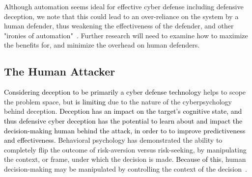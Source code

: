 \documentclass{article}
\newcommand\mmm[1]{\textcolor{black}{#1}}
\newcommand\kjf[1]{\textcolor{black}{#1}}
\newcommand\nnn[1]{\textcolor{black}{#1}}
\begin{document}
Although automation seems ideal for effective cyber defense including defensive deception, we note that this could lead to an over-reliance on the system by a human defender, thus weakening the effectiveness of the defender, and other "ironies of automation"~\cite{gutzwiller2021}. Further research will need to examine how to maximize the benefits for, and minimize the overhead on human defenders.

\subsection{The Human Attacker}
\nnn{Considering deception to be primarily a \mmm{cyber defense technology}} helps to scope the problem space, but \nnn{is limiting} due to the nature of the cyberpsychology behind deception. \nnn{Deception has an impact on the target's cognitive state, and thus defensive cyber deception has the potential to learn about \kjf{and impact} the decision-making human behind the attack, in order to to improve predictiveness and effectiveness.} Behavioral psychology has demonstrated the ability to completely flip the outcome of risk-aversion versus risk-seeking, by manipulating the context, or frame, under which the decision is made. \nnn{Because of this}, human decision-making may be manipulated by controlling the context of the decision~\cite{kahneman1979}\cite{tversky1974}. 
\end{document}

